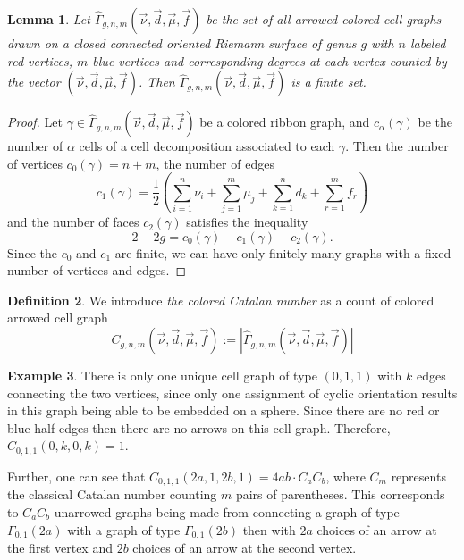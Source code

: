 \documentclass{amsart}
\newtheorem{Lem}{Lemma}[section]
\theoremstyle{definition}
\newtheorem{Ex}[Lem]{Example}
\newtheorem{Def}[Lem]{Definition}
\begin{document}
\begin{Lem}
Let $\widehat{\Gamma}_{g,n,m}(\overrightarrow{\nu},\overrightarrow{d},\overrightarrow{\mu},\overrightarrow{f})$ be the set of all arrowed colored cell graphs drawn on a closed connected oriented Riemann surface of genus $g$ with $n$ labeled red vertices, $m$ blue vertices and corresponding degrees at each vertex counted by the vector $(\overrightarrow{\nu}, \overrightarrow{d}, \overrightarrow{\mu}, \overrightarrow{f})$. Then $ \widehat{\Gamma}_{g,n,m}(\overrightarrow{\nu},\overrightarrow{d},\overrightarrow{\mu},\overrightarrow{f})$ is a finite set.   
\end{Lem}

\begin{proof}
Let $\gamma\in \widehat{\Gamma}_{g,n,m}(\overrightarrow{\nu},\overrightarrow{d},\overrightarrow{\mu},\overrightarrow{f})$ be a colored ribbon graph, and $c_{\alpha}(\gamma)$ be the number of $\alpha$ cells of a cell decomposition associated to each $\gamma$. Then the number of vertices 
$c_0(\gamma)=n+m$, the number of edges 
$$c_1(\gamma)=\dfrac{1}{2}\left(\sum_{i=1}^{n} \nu_i + \sum_{j=1}^m \mu_j +\sum_{k=1}^n d_k +\sum_{r=1}^{m} f_r\right)$$ and the number of faces $c_2(\gamma)$ satisfies the inequality
$$2-2g=c_0(\gamma)-c_1(\gamma)+c_2(\gamma).$$
Since the $c_0$ and $c_1$ are finite, we can have only finitely many graphs with a fixed number of vertices and edges. 

\end{proof}



\begin{Def}\label{cat def} We introduce {\it the colored Catalan number} as a count of colored arrowed cell graph 
$$C_{g, n, m}(\overrightarrow{\nu},\overrightarrow{d},\overrightarrow{\mu},\overrightarrow{f})
:=|\widehat{\Gamma}_{g,n,m}(\overrightarrow{\nu},\overrightarrow{d},\overrightarrow{\mu},\overrightarrow{f})|
$$
\end{Def}

\begin{Ex}
	There is only one unique cell graph of type $(0,1,1)$ with $k$ edges connecting the two vertices, since only one assignment of cyclic orientation results in this graph being able to be embedded on a sphere. Since there are no red or blue half edges then there are no arrows on this cell graph. Therefore, $C_{0,1,1}(0,k,0,k)=1$. 
	
	
	 Further, one can see that $C_{0,1,1}(2a,1,2b, 1)=4ab\cdot C_a C_b$, where $C_m$ represents the classical Catalan number counting $m$ pairs of parentheses. This corresponds to $C_aC_b$ unarrowed graphs being made from connecting a graph of type $\Gamma_{0,1}(2a)$ with a graph of type $\Gamma_{0,1}(2b)$ then with $2a$ choices of an arrow at the first vertex and $2b$ choices of an arrow at the second vertex.
\end{Ex}
\end{document}
